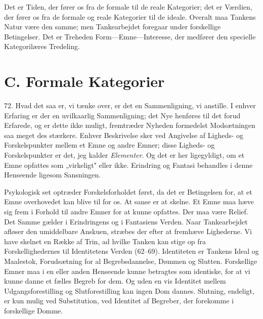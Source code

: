 \documentclass[12pt,a4paper]{book}
\newcommand{\apage}[1]{\marginnote{\footnotesize\textit{[#1]}}}
\begin{document}
Det er Tiden, der fører os fra de formale til de reale Kategorier; det
er Værdien, der fører os fra de formale og reale Kategorier til de
ideale. Overalt maa Tankens Natur være den samme; men Tankearbejdet
foregaar under forskellige Betingelser. Det er Treheden
Form---Emne---Interesse, der medfører den specielle Kategorilæres
Tredeling.

\section*{C. Formale Kategorier}
\label{sec:formale-kategorier}

72. Hvad det saa er, vi tænke over, er det en Sammenligning, vi
anstille. I enhver Erfaring er der en uvilkaarlig Sammenligning; det
Nye henføres til det forud Erfarede, og er dette ikke muligt,
fremtræder Nyheden formedelst Modsætningen saa meget des stærkere.
Enhver Beskrivelse sker ved Angivelse af Ligheds- og Forskelspunkter
mellem et Emne og andre Emner; disse Ligheds- og Forskelspunkter er
det, jeg kalder \emph{Elementer}. Og det er her ligegyldigt, om et Emne
opfattes som „virkeligt" eller ikke. Erindring og Fantasi behandles i
denne Henseende ligesom Sansningen.

Psykologisk set optræder Forskelsforholdet først, da det er
Betingelsen for, at et Emne overhovedet kan blive til for os. At sanse
er at skelne. Et Emne maa hæve sig frem i Forhold til andre Emner for
at kunne opfattes. Der maa være Relief. Det Samme gælder i Erindringens
og i Fantasiens Verden. Naar Tankearbejdet afløser den umiddelbare
Anskuen, stræbes der efter at fremhæve Lighederne. Vi have skelnet en
Række af Trin, ad hvilke Tanken kan stige op fra Forskellighedernes til
Identitetens Verden (62--69). Identiteten er Tankens Ideal og Maalestok, Forudsætning for al Begrebsdannelse, Dømmen og Slutten.
Forskellige Emner maa i en eller anden Henseende kunne betragtes som
identiske, for at vi kunne danne et fælles Begreb for dem. Og uden en
vis Identitet mellem Udgangsforestilling og Slutforestilling kan ingen
Dom dannes. Slutning, endeligt, er kun \apage{176} mulig ved Substitution, ved
Identitet af Begreber, der forekomme i forskellige Domme.
\end{document}
